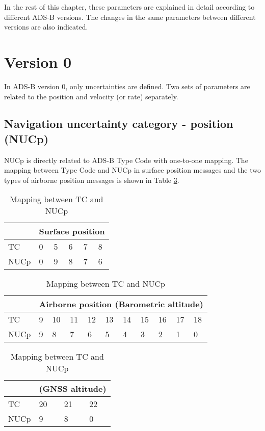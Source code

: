 In the rest of this chapter, these parameters are explained in detail according to different ADS-B versions. The changes in the same parameters between different versions are also indicated.


\section{Version 0}

In ADS-B version 0, only uncertainties are defined. Two sets of parameters are related to the position and velocity (or rate) separately.

\subsection{Navigation uncertainty category - position (NUCp)}

NUCp is directly related to ADS-B Type Code with one-to-one mapping. The mapping between Type Code and NUCp in surface position messages and the two types of airborne position messages is shown in Table \ref{tb:tc-nucp-mapping}.


\begin{table}[ht]
\caption{Mapping between TC and NUCp}
\label{tb:tc-nucp-mapping}

\begin{subtable}[t]{0.7\linewidth}
\begin{tabular}{|l||l|l|l|l|l|}
\hline
 & \multicolumn{5}{l|}{Surface position}  \\ \hline
TC & 0 & 5 & 6 & 7 & 8 \\ \hline
NUCp & 0 & 9 & 8 & 7 & 6 \\ \hline
\end{tabular}
\end{subtable}

\vspace{0.2cm}

\begin{subtable}[t]{0.7\linewidth}
\begin{tabular}{|l||l|l|l|l|l|l|l|l|l|l|}
\hline
  & \multicolumn{10}{l|}{Airborne position (Barometric altitude)} \\ \hline
TC & 9 & 10 & 11 & 12 & 13 & 14 & 15 & 16 & 17 & 18 \\ \hline
NUCp & 9 & 8 & 7 & 6 & 5 & 4 & 3 & 2 & 1 & 0 \\ \hline
\end{tabular}
\end{subtable}

\vspace{0.2cm}

\begin{subtable}[t]{0.7\linewidth}
\begin{tabular}{|l||l|l|l|}
\hline
  & \multicolumn{3}{l|}{(GNSS altitude)} \\ \hline
TC & 20 & 21 & 22 \\ \hline
NUCp & 9 & 8 & 0 \\ \hline
\end{tabular}
\end{subtable}

\end{table}

